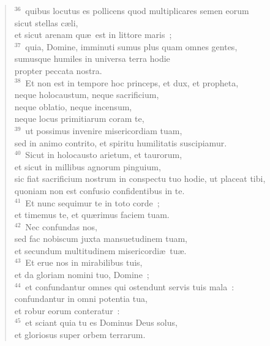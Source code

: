 \begin{verse}
${}^{36}$~quibus locutus es pollicens quod multiplicares semen eorum\\ sicut stellas c\ae li,\\ et sicut arenam qu\ae\ est in littore maris~;\\
${}^{37}$~quia, Domine, imminuti sumus plus quam omnes gentes,\\ sumusque humiles in universa terra hodie\\ propter peccata nostra.\\
${}^{38}$~Et non est in tempore hoc princeps, et dux, et propheta,\\ neque holocaustum, neque sacrificium,\\ neque oblatio, neque incensum,\\ neque locus primitiarum coram te,\\
${}^{39}$~ut possimus invenire misericordiam tuam,\\ sed in animo contrito, et spiritu humilitatis suscipiamur.\\
${}^{40}$~Sicut in holocausto arietum, et taurorum,\\ et sicut in millibus agnorum pinguium,\\ sic fiat sacrificium nostrum in conspectu tuo hodie, ut placeat tibi,\\ quoniam non est confusio confidentibus in te.\\
${}^{41}$~Et nunc sequimur te in toto corde~;\\ et timemus te, et qu\ae rimus faciem tuam.\\
${}^{42}$~Nec confundas nos,\\ sed fac nobiscum juxta mansuetudinem tuam,\\ et secundum multitudinem misericordi\ae\ tu\ae .\\
${}^{43}$~Et erue nos in mirabilibus tuis,\\ et da gloriam nomini tuo, Domine~;\\
${}^{44}$~et confundantur omnes qui ostendunt servis tuis mala~:\\ confundantur in omni potentia tua,\\ et robur eorum conteratur~:\\
${}^{45}$~et sciant quia tu es Dominus Deus solus,\\ et gloriosus super orbem terrarum.\end{verse}


